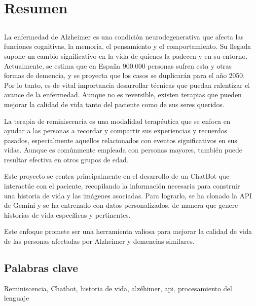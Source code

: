 \chapter*{Resumen}
\section*{\tituloPortadaVal}
La enfermedad de Alzheimer es una condición neurodegenerativa que afecta las funciones cognitivas, la memoria, el pensamiento y el comportamiento. Su llegada supone un cambio significativo en la vida de quienes la padecen y en su entorno. Actualmente, se estima que en España 900.000 personas sufren esta y otras formas de demencia, y se proyecta que los casos se duplicarán para el año 2050. Por lo tanto, es de vital importancia desarrollar técnicas que puedan ralentizar el avance de la enfermedad. Aunque no es reversible, existen terapias que pueden mejorar la calidad de vida tanto del paciente como de sus seres queridos.

La terapia de reminiscencia es una modalidad terapéutica que se enfoca en ayudar a las personas a recordar y compartir sus experiencias y recuerdos pasados, especialmente aquellos relacionados con eventos significativos en sus vidas. Aunque es comúnmente empleada con personas mayores, también puede resultar efectiva en otros grupos de edad.

Este proyecto se centra principalmente en el desarrollo de un ChatBot que interactúe con el paciente, recopilando la información necesaria para construir una historia de vida y las imágenes asociadas. Para lograrlo, se ha clonado la API de Gemini y se ha entrenado con datos personalizados, de manera que genere historias de vida específicas y pertinentes.

Este enfoque promete ser una herramienta valiosa para mejorar la calidad de vida de las personas afectadas por Alzheimer y demencias similares. 

\section*{Palabras clave}
   
\noindent Reminiscencia, Chatbot, historia de vida, alzéhimer, api, procesamiento del lenguaje

   



